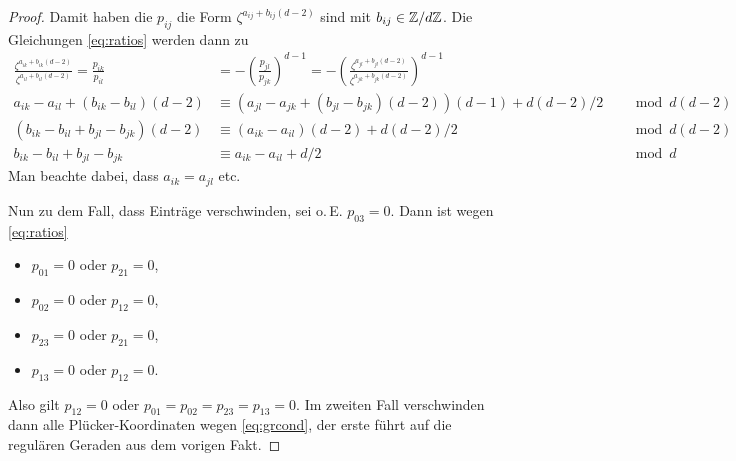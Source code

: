 \begin{proof}
Damit haben die $p_{ij}$ die Form $\zeta^{a_{ij} + b_{ij}(d-2)}$ sind mit $b_{ij} \in \Zmod dZ$. Die Gleichungen \eqref{eq:ratios} werden dann zu
\begin{align*}
\frac{\zeta^{a_{ik} + b_{ik}(d-2)}}{\zeta^{a_{il} + b_{il}(d-2)}} = \frac{p_{ik}}{p_{il}} &= -\left(\frac{p_{jl}}{p_{jk}}\right)^{d-1} = -\left(\frac{\zeta^{a_{jl} + b_{jl}(d-2)}}{\zeta^{a_{jk} + b_{jk}(d-2)}}\right)^{d-1} \\
a_{ik} - a_{il} + (b_{ik} - b_{il})(d-2) &\equiv (a_{jl} - a_{jk} + (b_{jl} - b_{jk})(d-2))(d-1) + d(d-2)/2 &&\mod{d(d-2)} \\
(b_{ik} - b_{il} + b_{jl} - b_{jk})(d-2) &\equiv (a_{ik} - a_{il})(d-2) + d(d-2)/2 &&\mod{d(d-2)} \\
b_{ik} - b_{il} + b_{jl} - b_{jk} &\equiv a_{ik} - a_{il} + d/2 &&\mod d
\end{align*}
Man beachte dabei, dass $a_{ik} = a_{jl}$ etc.


Nun zu dem Fall, dass Einträge verschwinden, sei o.\,E. $p_{03}=0$. Dann ist wegen \eqref{eq:ratios}
\begin{itemize}
\item $p_{01} = 0$ oder $p_{21} = 0$, %
\item $p_{02} = 0$ oder $p_{12} = 0$, %
\item $p_{23} = 0$ oder $p_{21} = 0$, %
\item $p_{13} = 0$ oder $p_{12} = 0$. %
\end{itemize}
Also gilt $p_{12} = 0$ oder $p_{01} = p_{02} = p_{23} = p_{13} = 0$. Im zweiten Fall verschwinden dann alle Plücker-Koordinaten wegen \eqref{eq:grcond}, der erste führt auf die regulären Geraden aus dem vorigen Fakt.
\end{proof}
